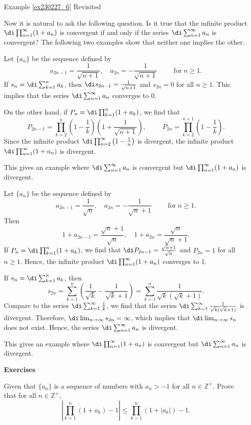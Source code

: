 \begin{example}{\linkt Example \ref{ex230227_6} Revisited}
\begin{example}[label=ex230227_13]{}
\begin{example}{}
Now it is natural to ask the following question.
 Is it true that the infinite product $\di\prod_{n=1}^{\infty}(1+a_n)$ is convergent if and only if the series $\di\sum_{n=1}^{\infty} a_n$ is convergent?
The following two examples show that neither one implies the other.

\begin{example}{}
Let $\{a_n\}$ be the sequence defined by
\[
a_{2n-1}=\frac{1}{\sqrt{n+1}},\quad a_{2n}=-\frac{1}{\sqrt{n+1}}\hspace{1cm}\text{for}\;n\geq 1.
\] If $s_n=\di\sum_{k=1}^na_k$, then
$\di s_{2n-1}=\frac{1}{\sqrt{n+1}}$ and $ s_{2n}=0$  for all $n\geq 1$.
This implies that the series $\di\sum_{n=1}^{\infty}a_n$ converges to 0.

On the other hand,
if $P_n=\di\prod_{k=1}^n(1+a_k)$, we find that
\[P_{2n-1}=\prod_{k=2}^{n}\left(1-\frac{1}{k}\right)\left(1+\frac{1}{\sqrt{n+1}}\right),\hspace{1cm}P_{2n}=\prod_{k=2}^{n+1}\left(1-\frac{1}{k}\right).\]
Since the infinite product
$\di \prod_{n=2}^{\infty}\left(1-\frac{1}{n}\right)$ is divergent, the infinite product $\di\prod_{n=1}^{\infty}(1+a_n)$ is divergent. 

This gives an example where $\di\sum_{n=1}^{\infty}a_n$ is convergent but $\di\prod_{n=1}^{\infty}(1+a_n)$ is divergent. 
\end{example}


\begin{example}{}
Let $\{a_n\}$ be the sequence defined by
\[
a_{2n-1}=\frac{1}{\sqrt{n}},\quad a_{2n}=-\frac{1}{\sqrt{n}+1}\hspace{1cm}\text{for}\;n\geq 1.
\]  
Then 
\[1+a_{2n-1}=\frac{\sqrt{n}+1}{\sqrt{n}},\quad 1+a_{2n}=\frac{\sqrt{n}}{\sqrt{n}+1}.\]
If $P_n=\di\prod_{k=1}^n(1+a_k)$, we find that
$\di P_{2n-1}=\frac{\sqrt{n}+1}{\sqrt{n}}$ and $P_{2n}=1$  for all $n\geq 1$. Hence, the infinite product  $\di\prod_{n=1}^{\infty}(1+a_n)$ converges to 1.

If $s_n=\di\sum_{k=1}^na_k$, then
\[
s_{2n} =\sum_{k=1}^n\left(\frac{1}{\sqrt{k}}-\frac{1}{\sqrt{k}+1}\right)=\sum_{k=1}^n \frac{1}{\sqrt{k}(\sqrt{k}+1)}.
\]
Compare to
the series $\di\sum_{k=1}^{\infty}\frac{1}{k}$, we find  that the series
$\di \sum_{k=1}^{\infty} \frac{1}{\sqrt{k}(\sqrt{k}+1)}$ is divergent. Therefore, $\di\lim_{n\rightarrow\infty}s_{2n}=\infty$, which implies that $\di\lim_{n\rightarrow \infty}s_n$ does not exist.  Hence, the series $\di\sum_{n=1}^{\infty}a_n$ is divergent.

This gives an example where $\di\prod_{n=1}^{\infty}(1+a_n)$ is convergent but $\di\sum_{n=1}^{\infty}a_n$ is divergent. 
\end{example}
\vp
\noindent
{\bf \large Exercises  \thesection}
\setcounter{myquestion}{1}
\begin{question}{\themyquestion}
Given that $\{a_n\}$ is a sequence of numbers with $a_n>-1$ for all $n\in\mathbb{Z}^+$. Prove that for all $n\in \mathbb{Z}^+$,
\[\left|\prod_{k=1}^n(1+a_k)-1\right|\leq \prod_{k=1}^n (1+|a_k|)-1.\]
\end{question}
\atc
 

\end{example}
\end{example}
\end{example}
